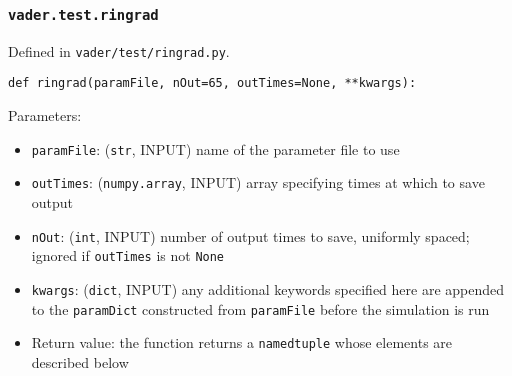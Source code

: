 \documentclass[12pt]{article}
\begin{document}
\subsubsection{\texttt{vader.test.ringrad}}
\label{sssec:vader.test.ringrad}

Defined in \verb=vader/test/ringrad.py=.

\begin{verbatim}
def ringrad(paramFile, nOut=65, outTimes=None, **kwargs):
\end{verbatim}

Parameters:
\begin{itemize}
\item \texttt{paramFile}: (\texttt{str}, INPUT) name of the parameter file to use
\item \texttt{outTimes}: (\texttt{numpy.array}, INPUT) array specifying times at which to save output
\item \texttt{nOut}: (\texttt{int}, INPUT) number of output times to save, uniformly spaced; ignored if \texttt{outTimes} is not \texttt{None}
\item \verb=kwargs=: (\verb=dict=, INPUT) any additional keywords specified here are appended to the \texttt{paramDict} constructed from \texttt{paramFile} before the simulation is run
\item Return value: the function returns a \texttt{namedtuple} whose elements are described below
\end{itemize}
\end{document}
